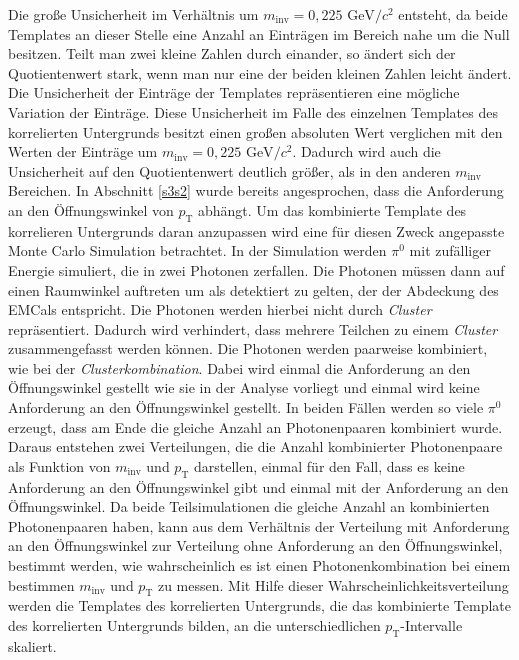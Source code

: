 Die große Unsicherheit im Verhältnis um $m_\text{inv} = 0,225\text{ GeV}/c^{2}$ entsteht, da beide Templates an dieser Stelle eine Anzahl an Einträgen im Bereich nahe um die Null besitzen.
Teilt man zwei kleine Zahlen durch einander, so ändert sich der Quotientenwert stark, wenn man nur eine der beiden kleinen Zahlen leicht ändert.
Die Unsicherheit der Einträge der Templates repräsentieren eine mögliche Variation der Einträge.
Diese Unsicherheit im Falle des einzelnen Templates des korrelierten Untergrunds besitzt einen großen absoluten Wert verglichen mit den Werten der Einträge um $m_\text{inv} = 0,225\text{ GeV}/c^{2}$.
Dadurch wird auch die Unsicherheit auf den Quotientenwert deutlich größer, als in den anderen $m_\text{inv}$ Bereichen.
\newline
In Abschnitt \ref{s3s2} wurde bereits angesprochen, dass die Anforderung an den Öffnungswinkel von $p_\text{T}$ abhängt.
Um das kombinierte Template des korrelieren Untergrunds daran anzupassen wird eine für diesen Zweck angepasste Monte Carlo Simulation betrachtet.
In der Simulation werden $\pi^{0}$ mit zufälliger Energie simuliert, die in zwei Photonen zerfallen.
Die Photonen müssen dann auf einen Raumwinkel auftreten um als detektiert zu gelten, der der Abdeckung des EMCals entspricht.
Die Photonen werden hierbei nicht durch \textit{Cluster} repräsentiert.
Dadurch wird verhindert, dass mehrere Teilchen zu einem \textit{Cluster} zusammengefasst werden können.
Die Photonen werden paarweise kombiniert, wie bei der \textit{Clusterkombination}.
Dabei wird einmal die Anforderung an den Öffnungswinkel gestellt wie sie in der Analyse vorliegt und einmal wird keine Anforderung an den Öffnungswinkel gestellt.
In beiden Fällen werden so viele $\pi^{0}$ erzeugt, dass am Ende die gleiche Anzahl an Photonenpaaren kombiniert wurde.
Daraus entstehen zwei Verteilungen, die die Anzahl kombinierter Photonenpaare als Funktion von $m_\text{inv}$ und $p_\text{T}$ darstellen, einmal für den Fall, dass es keine Anforderung an den Öffnungswinkel gibt und einmal mit der Anforderung an den Öffnungswinkel.
Da beide Teilsimulationen die gleiche Anzahl an kombinierten Photonenpaaren haben, kann aus dem Verhältnis der Verteilung mit Anforderung an den Öffnungswinkel zur Verteilung ohne Anforderung an den Öffnungswinkel, bestimmt werden, wie wahrscheinlich es ist einen Photonenkombination bei einem bestimmen $m_\text{inv}$ und $p_\text{T}$ zu messen.
Mit Hilfe dieser Wahrscheinlichkeitsverteilung werden die Templates des korrelierten Untergrunds, die das kombinierte Template des korrelierten Untergrunds bilden, an die unterschiedlichen $p_\text{T}$-Intervalle skaliert.
